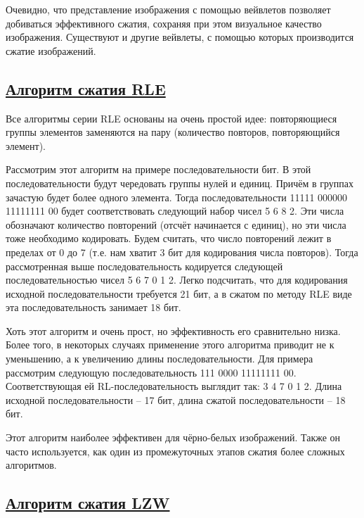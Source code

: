 
Очевидно, что представление изображения с помощью вейвлетов позволяет добиваться эффективного сжатия, сохраняя при этом визуальное качество изображения. Существуют и другие вейвлеты, с помощью которых производится сжатие изображений.

\subsection*{\hyperlink{toc}{Алгоритм сжатия RLE}}

Все алгоритмы серии RLE основаны на очень простой идее: повторяющиеся группы элементов заменяются на пару (количество повторов, повторяющийся элемент). 

Рассмотрим этот алгоритм на примере последовательности бит. В этой последовательности будут чередовать группы нулей и единиц. Причём в группах зачастую будет более одного элемента. Тогда последовательности 11111 000000 11111111 00 будет соответствовать следующий набор чисел 5 6 8 2. Эти числа обозначают количество повторений (отсчёт начинается с единиц), но эти числа тоже необходимо кодировать. Будем считать, что число повторений лежит в пределах от 0 до 7 (т.е. нам хватит 3 бит для кодирования числа повторов). Тогда рассмотренная выше последовательность кодируется следующей последовательностью чисел 5 6 7 0 1 2. Легко подсчитать, что для кодирования исходной последовательности требуется 21 бит, а в сжатом по методу RLE виде эта последовательность занимает 18 бит.

Хоть этот алгоритм и очень прост, но эффективность его сравнительно низка. Более того, в некоторых случаях применение этого алгоритма приводит не к уменьшению, а к увеличению длины последовательности. Для примера рассмотрим следующую последовательность 111 0000 11111111 00. Соответствующая ей RL-последовательность выглядит так: 3 4 7 0 1 2. Длина исходной последовательности – 17 бит, длина сжатой последовательности – 18 бит.

Этот алгоритм наиболее эффективен для чёрно-белых изображений. Также он часто используется, как один из промежуточных этапов сжатия более сложных алгоритмов.

\subsection*{\hyperlink{toc}{Алгоритм сжатия LZW}}

